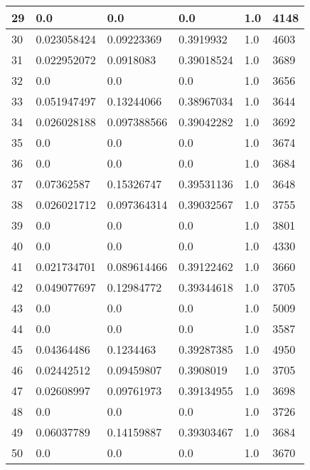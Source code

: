 \begin{longtable}{|l|l|l|l|l|l|}
29 & 0.0 & 0.0 & 0.0 & 1.0 & 4148 \\ \hline 
30 & 0.023058424 & 0.09223369 & 0.3919932 & 1.0 & 4603 \\ \hline 
31 & 0.022952072 & 0.0918083 & 0.39018524 & 1.0 & 3689 \\ \hline 
32 & 0.0 & 0.0 & 0.0 & 1.0 & 3656 \\ \hline 
33 & 0.051947497 & 0.13244066 & 0.38967034 & 1.0 & 3644 \\ \hline 
34 & 0.026028188 & 0.097388566 & 0.39042282 & 1.0 & 3692 \\ \hline 
35 & 0.0 & 0.0 & 0.0 & 1.0 & 3674 \\ \hline 
36 & 0.0 & 0.0 & 0.0 & 1.0 & 3684 \\ \hline 
37 & 0.07362587 & 0.15326747 & 0.39531136 & 1.0 & 3648 \\ \hline 
38 & 0.026021712 & 0.097364314 & 0.39032567 & 1.0 & 3755 \\ \hline 
39 & 0.0 & 0.0 & 0.0 & 1.0 & 3801 \\ \hline 
40 & 0.0 & 0.0 & 0.0 & 1.0 & 4330 \\ \hline 
41 & 0.021734701 & 0.089614466 & 0.39122462 & 1.0 & 3660 \\ \hline 
42 & 0.049077697 & 0.12984772 & 0.39344618 & 1.0 & 3705 \\ \hline 
43 & 0.0 & 0.0 & 0.0 & 1.0 & 5009 \\ \hline 
44 & 0.0 & 0.0 & 0.0 & 1.0 & 3587 \\ \hline 
45 & 0.04364486 & 0.1234463 & 0.39287385 & 1.0 & 4950 \\ \hline 
46 & 0.02442512 & 0.09459807 & 0.3908019 & 1.0 & 3705 \\ \hline 
47 & 0.02608997 & 0.09761973 & 0.39134955 & 1.0 & 3698 \\ \hline 
48 & 0.0 & 0.0 & 0.0 & 1.0 & 3726 \\ \hline 
49 & 0.06037789 & 0.14159887 & 0.39303467 & 1.0 & 3684 \\ \hline 
50 & 0.0 & 0.0 & 0.0 & 1.0 & 3670 \\ \hline 
\end{longtable}